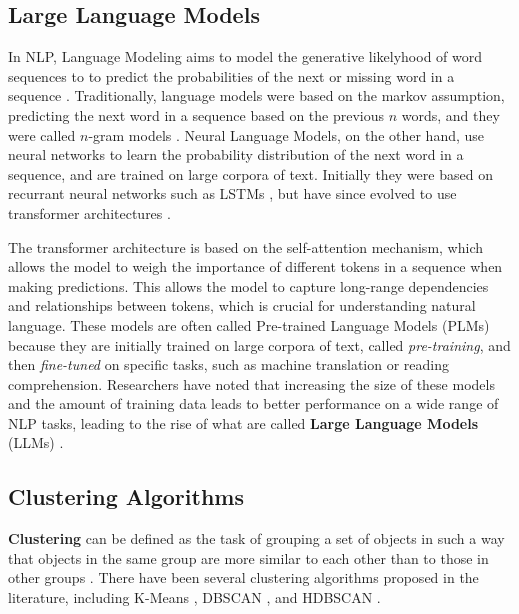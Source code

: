 
\subsection{Large Language Models}
In NLP, Language Modeling aims to model the generative likelyhood of word sequences to to predict the probabilities of the next or missing word
in a sequence \cite{zhaoSurveyLargeLanguage2025}. Traditionally, language models were based on the markov assumption, predicting the next word 
in a sequence based on the previous $n$ words, and they were called $n$-gram models \cite{jm3}. Neural Language Models, on the other hand, use neural networks
to learn the probability distribution of the next word in a sequence, and are trained on large corpora of text. Initially they were based on recurrant neural networks
such as LSTMs \cite{hochreiterLongShortTermMemory1997}, but have since evolved to use transformer architectures \cite{vaswaniAttentionAllYou2023}.

The transformer architecture is based on the self-attention mechanism, which allows the model to weigh the importance of different tokens in a sequence
when making predictions. This allows the model to capture long-range dependencies and relationships between tokens, which is crucial for 
understanding natural language. These models are often called Pre-trained Language Models (PLMs) because they are initially trained on large corpora of text,
called \textit{pre-training}, and then \textit{fine-tuned} on specific tasks, such as machine translation or reading comprehension. Researchers have noted that increasing the size of these models and the amount of training data leads to better performance on a wide range of NLP tasks, leading to the
rise of what are called \textbf{Large Language Models} (LLMs) \cite{brownLanguageModelsAre2020}.



\subsection{Clustering Algorithms}
\textbf{Clustering} can be defined as the task of grouping a set of objects in such a way that objects in the same group are more similar to 
each other than to those in other groups \cite{jainDataClustering502010}. There have been several clustering algorithms proposed in the literature,
including K-Means \cite{lloydLeastSquaresQuantization1982}, DBSCAN \cite{esterDensitybasedAlgorithmDiscovering1996}, and HDBSCAN \cite{campelloDensityBasedClusteringBased2013}.

